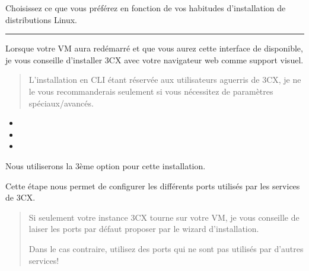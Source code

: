 \documentclass[letterpaper,10pt,french]{sphinxmanual}
\begin{document}
\sphinxAtStartPar
Choisissez ce que vous préférez en fonction de vos habitudes d’installation de distributions Linux.

\sphinxAtStartPar


\sphinxAtStartPar
{}


\bigskip\hrule\bigskip


\sphinxAtStartPar


\sphinxAtStartPar


\sphinxAtStartPar
Lorsque votre VM aura redémarré et que vous aurez cette interface de disponible, je vous conseille d’installer 3CX avec votre navigateur web comme support visuel.

\sphinxAtStartPar

\begin{quote}

\sphinxAtStartPar
L’installation en CLI étant réservée aux utilisateurs aguerris de 3CX, je ne le vous recommanderais seulement si vous nécessitez de paramètres spéciaux/avancés.
\end{quote}

\sphinxAtStartPar


\noindent{}

\sphinxAtStartPar

\begin{itemize}
\item {} 
\sphinxAtStartPar
{}

\item {} 
\sphinxAtStartPar
{}

\item {} 
\sphinxAtStartPar
{}

\end{itemize}

\sphinxAtStartPar
Nous utiliserons la 3ème option pour cette installation.

\sphinxAtStartPar


\noindent{}

\sphinxAtStartPar


\sphinxAtStartPar
Cette étape nous permet de configurer les différents ports utilisés par les services de 3CX.
\begin{quote}

\sphinxAtStartPar
Si seulement votre instance 3CX tourne sur votre VM, je vous conseille de laiser les ports par défaut proposer par le wizard d’installation.

\sphinxAtStartPar
Dans le cas contraire, utilisez des ports qui ne sont pas utilisés par d’autres services!
\end{quote}
\end{document}
